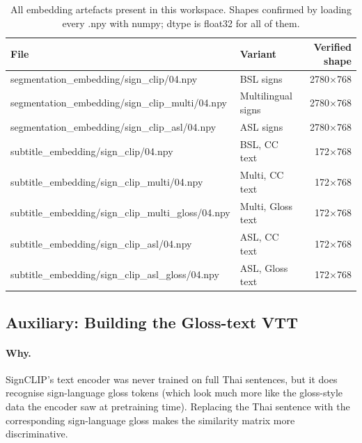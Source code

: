 \documentclass[11pt,a4paper]{article}
\def\texttt#1{#1}%
\def\textbf#1{#1}%
\begin{document}
\begin{table}[h]
\centering
\small
\begin{tabularx}{\linewidth}{lXr}
\toprule
\textbf{File} & \textbf{Variant} & \textbf{Verified shape} \\
\midrule
\texttt{segmentation\_embedding/sign\_clip/04.npy}            & BSL signs           & 2780$\times$768 \\
\texttt{segmentation\_embedding/sign\_clip\_multi/04.npy}     & Multilingual signs  & 2780$\times$768 \\
\texttt{segmentation\_embedding/sign\_clip\_asl/04.npy}       & ASL signs           & 2780$\times$768 \\
\texttt{subtitle\_embedding/sign\_clip/04.npy}                & BSL, CC text        & 172$\times$768  \\
\texttt{subtitle\_embedding/sign\_clip\_multi/04.npy}         & Multi, CC text      & 172$\times$768  \\
\texttt{subtitle\_embedding/sign\_clip\_multi\_gloss/04.npy}  & Multi, Gloss text   & 172$\times$768  \\
\texttt{subtitle\_embedding/sign\_clip\_asl/04.npy}           & ASL, CC text        & 172$\times$768  \\
\texttt{subtitle\_embedding/sign\_clip\_asl\_gloss/04.npy}    & ASL, Gloss text     & 172$\times$768  \\
\bottomrule
\end{tabularx}
\caption{All embedding artefacts present in this workspace.
Shapes confirmed by loading every \texttt{.npy} with \texttt{numpy};
\texttt{dtype} is \texttt{float32} for all of them.}
\label{tab:embeddings}
\end{table}


\subsection{Auxiliary: Building the Gloss-text VTT}
\label{sec:gloss-vtt}

\paragraph{Why.} SignCLIP's text encoder was never trained on full Thai
sentences, but it does recognise sign-language gloss tokens (which look
much more like the gloss-style data the encoder saw at pretraining time).
Replacing the Thai sentence with the corresponding sign-language gloss makes
the similarity matrix more discriminative.
\end{document}
